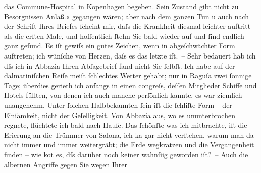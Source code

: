 \begin{ledgroupsized}[t]{13cm}
{{{                     das Commune-Hospital in
                        Kopenhagen begeben. Sein Zustand gibt nicht zu Besorgnissen
                     Anlaß.«}}}\label{K_L01034_1h} gegangen wären; aber nach dem ganzen Tun u auch nach der
               Schrift Ihres Briefes ſcheint mir, daſs die Krankheit diesmal leichter auftritt als
               die erſten Male, und hoffentlich ſtehn Sie bald wieder auf und ſind endlich ganz
               geſund. Es iſt gewiſs ein gutes Zeichen, wenn \label{K_L01034_2v}\label{K_L01034_2h} in abgeſchwächter Form auftreten; {\pb}ich wünſche von Herzen, daſs es das letzte iſt. –
               Sehr bedauert hab ich dſs ich in Abbazia Ihren
               Abſagebrief fand nicht Sie ſelbſt. Ich habe auf der dalmatiniſchen Reiſe meiſt ſchlechtes Wetter gehabt; nur in Raguſa zwei ſonnige Tage; überdies gerieth ich
               anfangs in einen \label{K_L01034_3v}\label{K_L01034_3h}congreſs, deſſen Mitglieder Schiffe und Hotels füllten, von
               denen ich auch manche perſönlich kannte, es war ziemlich unangenehm. Unter ſolchen
                  Halb{\pb}bekannten ſein iſt die ſchli{\geminationm}ſte Form – der Einſamkeit, nicht der Geſelligkeit. Von
                  Abbazia aus, wo es ununterbrochen regnete,
               flüchtete ich bald nach Hauſe. Das ſchönſte was ich mitbrachte, iſt die Eri{\geminationn}erung an die Trümmer von Salona, ich ka{\geminationn} gar nicht verſtehen, warum man
               da nicht immer und immer weitergräbt; die Erde wegkratzen und die Vergangenheit
               finden – wie ko{\geminationm}t es, dſs darüber noch keiner wahnſi{\geminationn}ig {\pb}geworden
               iſt? –\pend
           \pstart
           Auch die albernen Angriffe gegen Sie wegen Ihrer \label{K_L01034_4v}
\end{ledgroupsized}
